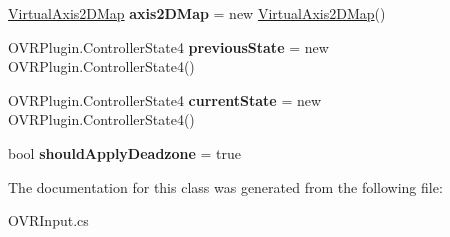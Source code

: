 \begin{DoxyCompactItemize}
\item 
\mbox{\label{class_o_v_r_input_1_1_o_v_r_controller_base_a6e1ad31d439fa9937a1c8367c675fad5}} 
\mbox{\hyperlink{class_o_v_r_input_1_1_o_v_r_controller_base_1_1_virtual_axis2_d_map}{Virtual\+Axis2\+D\+Map}} {\bfseries axis2\+D\+Map} = new \mbox{\hyperlink{class_o_v_r_input_1_1_o_v_r_controller_base_1_1_virtual_axis2_d_map}{Virtual\+Axis2\+D\+Map}}()
\item 
\mbox{\label{class_o_v_r_input_1_1_o_v_r_controller_base_adaab793b95d742821ba67d6fe13b9b5f}} 
O\+V\+R\+Plugin.\+Controller\+State4 {\bfseries previous\+State} = new O\+V\+R\+Plugin.\+Controller\+State4()
\item 
\mbox{\label{class_o_v_r_input_1_1_o_v_r_controller_base_ae47e2676e188de1f17f707c658d09b55}} 
O\+V\+R\+Plugin.\+Controller\+State4 {\bfseries current\+State} = new O\+V\+R\+Plugin.\+Controller\+State4()
\item 
\mbox{\label{class_o_v_r_input_1_1_o_v_r_controller_base_a389846f10c8ffd92b237145b29e15304}} 
bool {\bfseries should\+Apply\+Deadzone} = true
\end{DoxyCompactItemize}


The documentation for this class was generated from the following file\+:\begin{DoxyCompactItemize}
\item 
O\+V\+R\+Input.\+cs\end{DoxyCompactItemize}

